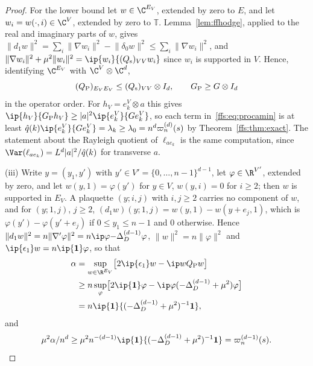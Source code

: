 \begin{proof}
For the lower bound let $w\in\C^{E_V}$, extended by zero to $E$, and let
$w_i=w(\cdot,i)\in\C^V$, extended by zero to $\mathbb T$. Lemma~\ref{lem:ffhodge},
applied to the real and imaginary parts of $w$, gives $\lVert d_1w\rVert^2=
\sum_i\lVert\nabla w_i\rVert^2-\lVert\delta_0w\rVert^2\le\sum_i\lVert\nabla w_i
\rVert^2$, and $\lVert\nabla w_i\rVert^2+\mu^2\lVert w_i\rVert^2=\ip{w_i}{(Q_{
\rm s})_{VV}w_i}$ since $w_i$ is supported in $V$. Hence, identifying $\C^{E_V}$
with $\C^V\otimes\C^d$,
\[
(Q_{\rm P})_{E_VE_V}\le(Q_{\rm s})_{VV}\otimes I_d,\qquad G_{\rm P}\ge G\otimes
I_d
\]
in the operator order. For $h_V=e_k^V\otimes a$ this gives $\ip{h_V}{G_{\rm P}
h_V}\ge\lvert a\rvert^2\ip{e_k^V}{Ge_k^V}$, so each term in~\eqref{ffs:eq:procamin}
is at least $\hat q(k)\ip{e_k^V}{Ge_k^V}=\lambda_k\ge\lambda_0=n^d\varpi_n^{(d)}
(s)$ by Theorem~\ref{ffs:thm:exact}. The statement about the Rayleigh quotient
of $\ell_{ae_k}$ is the same computation, since $\Var(\ell_{ae_k})=L^d\lvert a
\rvert^2/\hat q(k)$ for transverse $a$.

(iii) Write $y=(y_1,y')$ with $y'\in V'=\{0,\dots,n-1\}^{d-1}$, let $\varphi
\in\R^{V'}$, extended by zero, and let $w(y,1)=\varphi(y')$ for $y\in V$, $w(y,
i)=0$ for $i\ge2$; then $w$ is supported in $E_V$. A plaquette $(y;i,j)$ with
$i,j\ge2$ carries no component of $w$, and for $(y;1,j)$, $j\ge2$, $(d_1w)(y;1,
j)=w(y,1)-w(y+e_j,1)$, which is $\varphi(y')-\varphi(y'+e_j)$ if $0\le y_1\le
n-1$ and $0$ otherwise. Hence $\lVert d_1w\rVert^2=n\lVert\nabla'\varphi\rVert^2
=n\ip\varphi{-\Delta_D^{(d-1)}\varphi}$, $\lVert w\rVert^2=n\lVert\varphi
\rVert^2$ and $\ip{\epsilon_1}w=n\ip{\mathbf 1}\varphi$, so that
\begin{align*}
\alpha&=\sup_{w\in\R^{E_V}}\bigl[2\ip{\epsilon_1}w-\ip w{Q_{\rm P}w}\bigr]\\
&\ge n\sup_{\varphi}\bigl[2\ip{\mathbf 1}\varphi-\ip\varphi{(-\Delta_D^{(d-1)}
+\mu^2)\varphi}\bigr]\\
&=n\ip{\mathbf 1}{(-\Delta_D^{(d-1)}+\mu^2)^{-1}\mathbf 1},
\end{align*}
and
\[
\mu^2\alpha/n^d\ge\mu^2n^{-(d-1)}\ip{\mathbf 1}{(-\Delta_D^{(d-1)}+\mu^2)
^{-1}\mathbf 1}=\varpi_n^{(d-1)}(s).
\]
\end{proof}

